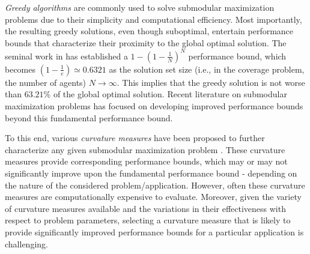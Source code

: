 \documentclass[letterpaper, 10 pt, conference]{ieeeconf}
\begin{document}
\emph{Greedy algorithms} are commonly used to solve submodular maximization problems due to their simplicity and computational efficiency. Most importantly, the resulting greedy solutions, even though suboptimal, entertain performance bounds that characterize their proximity to the global optimal solution. The seminal work in \cite{Nemhauser1978} has established a $1-(1-\frac{1}{N})^N$ performance bound, which becomes $(1-\frac{1}{e}) \simeq 0.6321$ as the solution set size (i.e., in the coverage problem, the number of agents) $N\rightarrow \infty$. This implies that the greedy solution is not worse than $63.21\%$ of the global optimal solution. Recent literature on submodular maximization problems has focused on developing improved performance bounds beyond this fundamental performance bound. 


To this end, various \emph{curvature measures} have been proposed to further characterize any given submodular maximization problem \cite{Conforti1984,Wang2016,Liu2018,WelikalaJ02021}. These curvature measures provide corresponding performance bounds, which may or may not significantly improve upon the fundamental performance bound - depending on the nature of the considered problem/application. 
However, often these curvature measures are computationally expensive to evaluate. 
Moreover, given the variety of curvature measures available and the variations in their effectiveness with respect to problem parameters, selecting a curvature measure that is likely to provide significantly improved performance bounds for a particular application is challenging.    
\end{document}

